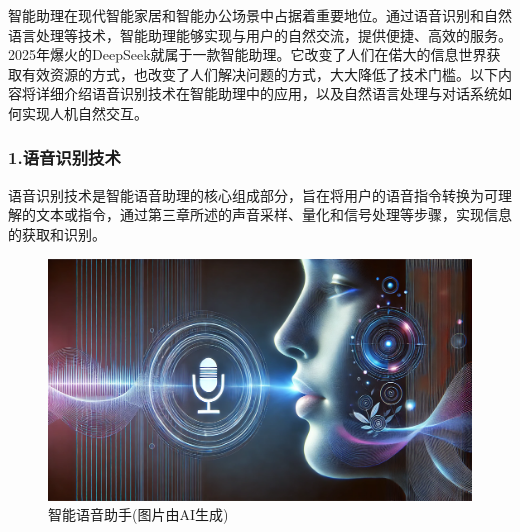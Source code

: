 智能助理在现代智能家居和智能办公场景中占据着重要地位。通过语音识别和自然语言处理等技术，智能助理能够实现与用户的自然交流，提供便捷、高效的服务。2025年爆火的DeepSeek就属于一款智能助理。它改变了人们在偌大的信息世界获取有效资源的方式，也改变了人们解决问题的方式，大大降低了技术门槛。以下内容将详细介绍语音识别技术在智能助理中的应用，以及自然语言处理与对话系统如何实现人机自然交互。

\subsubsection{1.语音识别技术}

语音识别技术是智能语音助理的核心组成部分，旨在将用户的语音指令转换为可理解的文本或指令，通过第三章所述的声音采样、量化和信号处理等步骤，实现信息的获取和识别。

\begin{figure}[ht]
  \centering
  \includegraphics[width=\linewidth]{image/4/智能语音助手.png}
  \caption{智能语音助手(图片由AI生成)}
  \label{fig:智能语音助手}
\end{figure}


